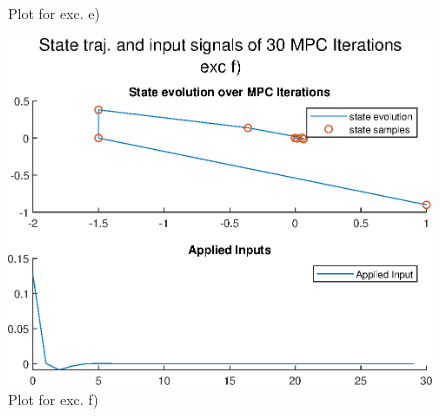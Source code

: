 \documentclass[]{article}
\begin{document}
\begin{enumerate}
{\begin{figure}[H]
					\caption[Plot for exc. e)]{Plot for exc. e)}
					\label{fig:exce}
				\end{figure}}
		{	\item[f)]
			\begin{figure}[H]
				\centering
				\includegraphics[width=0.9\linewidth]{plots/exc_f}
				\caption[Plot for exc. f)]{Plot for exc. f)}
				\label{fig:excf}
			\end{figure}}
					
		\end{enumerate}	
		
\end{document}
